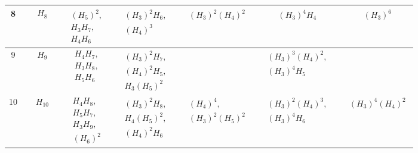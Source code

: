 \begin{table}[H]
\begin{tabular}{ccccccc}
  8 & $\begin{aligned}&H_{8}\end{aligned}$ & $\begin{aligned}&(H_{5})^2,\\&H_{3}H_{7},\\&H_{4}H_{6}\end{aligned}$ & $\begin{aligned}&(H_{3})^2H_{6},\\&(H_{4})^3\end{aligned}$ & $\begin{aligned}&(H_{3})^2(H_{4})^2\end{aligned}$ & $\begin{aligned}&(H_{3})^4H_{4}\end{aligned}$ & $\begin{aligned}&(H_{3})^6\end{aligned}$ \\
  \hline
  9 & $\begin{aligned}&H_{9}\end{aligned}$ & $\begin{aligned}&H_{4}H_{7},\\&H_{3}H_{8},\\&H_{5}H_{6}\end{aligned}$ & $\begin{aligned}&(H_{3})^2H_{7},\\&(H_{4})^2H_{5},\\&H_{3}(H_{5})^2\end{aligned}$ &  & $\begin{aligned}&(H_{3})^3(H_{4})^2,\\&(H_{3})^4H_{5}\end{aligned}$ &  \\
  \hline
  10 & $\begin{aligned}&H_{10}\end{aligned}$ & $\begin{aligned}&H_{4}H_{8},\\&H_{5}H_{7},\\&H_{3}H_{9},\\&(H_{6})^2\end{aligned}$ & $\begin{aligned}&(H_{3})^2H_{8},\\&H_{4}(H_{5})^2,\\&(H_{4})^2H_{6}\end{aligned}$ & $\begin{aligned}&(H_{4})^4,\\&(H_{3})^2(H_{5})^2\end{aligned}$ & $\begin{aligned}&(H_{3})^2(H_{4})^3,\\&(H_{3})^4H_{6}\end{aligned}$ & $\begin{aligned}&(H_{3})^4(H_{4})^2\end{aligned}$ \\

\end{tabular}
\end{table}
